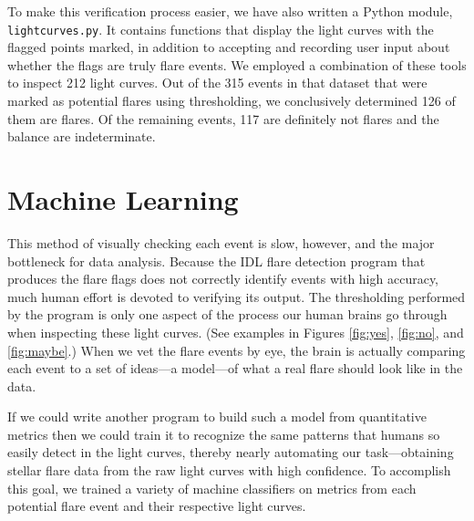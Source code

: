 \documentclass[11pt]{article}
\begin{document}
To make this verification process easier, we have also written a
Python module, \verb|lightcurves.py|.  It contains functions that
display the light curves with the flagged points marked, in addition
to accepting and recording user input about whether the flags are
truly flare events.  We employed a combination of these tools to
inspect 212 light curves.  Out of the 315 events in that dataset that
were marked as potential flares using thresholding, we conclusively
determined 126 of them are flares.  Of the remaining events, 117 are
definitely not flares and the balance are indeterminate.



\section{Machine Learning}
\label{sec:ml}

This method of visually checking each event is slow, however, and the
major bottleneck for data analysis. Because the IDL flare detection
program that produces the flare flags does not correctly identify
events with high accuracy, much human effort is devoted to verifying
its output.  The thresholding performed by the program is only one
aspect of the process our human brains go through when inspecting
these light curves.  (See examples in Figures \ref{fig:yes},
\ref{fig:no}, and \ref{fig:maybe}.)  When we vet the flare events by
eye, the brain is actually comparing each event to a set of ideas---a
model---of what a real flare should look like in the data.

If we could write another program to build such a model from
quantitative metrics then we could train it to recognize the same
patterns that humans so easily detect in the light curves, thereby
nearly automating our task---obtaining stellar flare data from the raw
light curves with high confidence.  To accomplish this goal, we
trained a variety of machine classifiers on metrics from each
potential flare event and their respective light curves.
\end{document}
